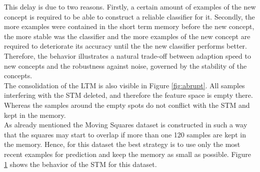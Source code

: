 \documentclass[conference]{IEEEtran}
\begin{document}
This delay is due to two reasons. Firstly, a certain amount of examples of the new concept is required to be able to construct a reliable classifier for it. Secondly,
the more examples were contained in the short term memory before the new concept, the more stable was the classifier and the more examples of the 
new concept are required to deteriorate its accuracy until the the new classifier performs better. Therefore, the behavior illustrates a natural trade-off between adaption speed
to new concepts and the robustness against noise, governed by the stability of the concepts.\\
The consolidation of the LTM is also visible in Figure \ref{fig:abrupt}. All samples interfering with the STM deleted, and therefore the feature space is empty there. 
Whereas the samples around the empty spots do not conflict with the STM and kept in the memory.\\
As already mentioned the Moving Squares dataset is constructed in such a way that the squares may start to overlap if more than one 120 samples are kept in the memory. Hence,
for this dataset the best strategy is to use only the most recent examples for prediction and keep the memory as small as possible. 
Figure \ref{fig:squares} shows the behavior of the STM for this dataset. 
\begin{figure}
\centering
	\vspace{0 pt}
\label{fig:squares}
\caption{}
\end{figure}
\end{document}
